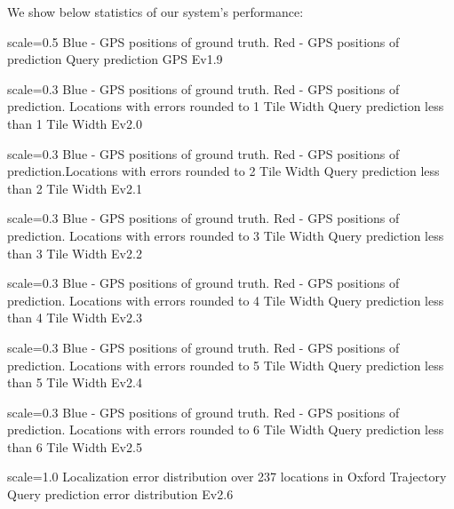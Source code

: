 We show below statistics of our system's performance:

{scale=0.5}%
{Blue - GPS positions of ground truth. Red - GPS positions of prediction}%
{Query prediction GPS}%
{Ev1.9}

{scale=0.3}%
{Blue - GPS positions of ground truth. Red - GPS positions of prediction. Locations with errors rounded to 1 Tile Width}%
{Query prediction less than 1 Tile Width}%
{Ev2.0}

{scale=0.3}%
{Blue - GPS positions of ground truth. Red - GPS positions of prediction.Locations with errors rounded to 2 Tile Width}%
{Query prediction less than 2 Tile Width}%
{Ev2.1}

{scale=0.3}%
{Blue - GPS positions of ground truth. Red - GPS positions of prediction. Locations with errors rounded to 3 Tile Width}%
{Query prediction less than 3 Tile Width}%
{Ev2.2}

{scale=0.3}%
{Blue - GPS positions of ground truth. Red - GPS positions of prediction. Locations with errors rounded to 4 Tile Width}%
{Query prediction less than 4 Tile Width}%
{Ev2.3}

{scale=0.3}%
{Blue - GPS positions of ground truth. Red - GPS positions of prediction. Locations with errors rounded to 5 Tile Width}%
{Query prediction less than 5 Tile Width}%
{Ev2.4}

{scale=0.3}%
{Blue - GPS positions of ground truth. Red - GPS positions of prediction. Locations with errors rounded to 6 Tile Width}%
{Query prediction less than 6 Tile Width}%
{Ev2.5}

{scale=1.0}%
{Localization error distribution over 237 locations in Oxford Trajectory}%
{Query prediction error distribution}%
{Ev2.6}

